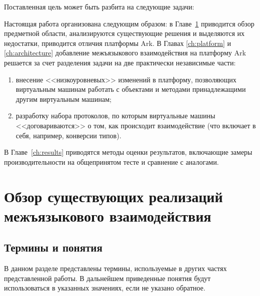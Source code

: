 \documentclass[times
]{itmo-student-thesis}
\begin{document}
Поставленная цель может быть разбита на следующие задачи:
\begin{enumerate}
	\MyResearchTargets
\end{enumerate}

Настоящая работа организована следующим образом: в Главе~\ref{ch:overview} приводится обзор предметной области, анализируются существующие решения и выделяются их недостатки, приводится отличия платформы Ark. В Главах \ref{ch:platform} и \ref{ch:architecture} добавление межъязыкового взаимодействия на платформу Ark решается за счет разделения задачи на две практически независимые части:
\begin{enumerate}
	\item внесение <<низкоуровневых>> изменений в платформу, позволяющих виртуальным машинам работать с объектами и методами принадлежащими другим виртуальным машинам;
	\item разработку набора протоколов, по которым виртуальные машины <<договариваются>> о том, как происходит взаимодействие (что включает в себя, например, конверсии типов).
\end{enumerate}

В Главе~\ref{ch:results} приводятся методы оценки результатов, включающие замеры производительности на общепринятом тесте и сравнение с аналогами.

\chapter{Обзор существующих реализаций межъязыкового взаимодействия}\label{ch:overview}

\startrelatedwork

\section{Термины и понятия}
В данном разделе представлены термины, используемые в других частях представленной работы. В дальнейшем приведенные понятия будут использоваться в указанных значениях, если не указано обратное.
\def\MakeTerm#1#2{\textit{#1}~--- #2.\par}
\end{document}
